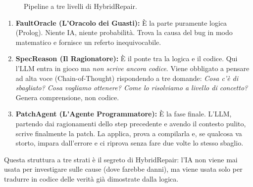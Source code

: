 \begin{figure}[h]
\centering
{}
\caption{Pipeline a tre livelli di HybridRepair.}
\end{figure}

\begin{enumerate}
    \item \textbf{FaultOracle (L'Oracolo dei Guasti):} È la parte puramente logica (Prolog). Niente IA, 
            niente probabilità. Trova la causa del bug in modo matematico e fornisce un referto inequivocabile.
    \item \textbf{SpecReason (Il Ragionatore):} È il ponte tra la logica e il codice. Qui l'LLM entra in gioco 
            ma \textit{non scrive ancora codice}. Viene obbligato a pensare ad alta voce (Chain-of-Thought) 
            rispondendo a tre domande: \textit{Cosa c'è di sbagliato? Cosa vogliamo ottenere? Come lo risolviamo 
            a livello di concetto?} Genera comprensione, non codice.
    \item \textbf{PatchAgent (L'Agente Programmatore):} È la fase finale. L'LLM, partendo dai ragionamenti 
            dello step precedente e avendo il contesto pulito, scrive finalmente la patch. La applica, prova 
            a compilarla e, se qualcosa va storto, impara dall'errore e ci riprova senza fare due volte lo stesso sbaglio.
\end{enumerate}

Questa struttura a tre strati è il segreto di HybridRepair: l'IA non viene mai usata per investigare sulle 
cause (dove farebbe danni), ma viene usata solo per tradurre in codice delle verità già dimostrate dalla logica.